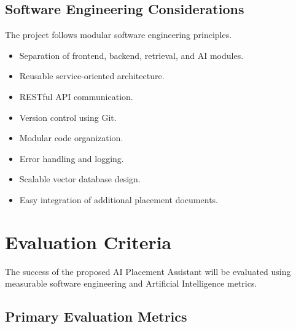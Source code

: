 \documentclass[11pt]{article}
\begin{document}
\subsection{Software Engineering Considerations}

The project follows modular software engineering principles.

\begin{itemize}

\item Separation of frontend, backend, retrieval, and AI modules.

\item Reusable service-oriented architecture.

\item RESTful API communication.

\item Version control using Git.

\item Modular code organization.

\item Error handling and logging.

\item Scalable vector database design.

\item Easy integration of additional placement documents.

\end{itemize}
\section{Evaluation Criteria}

The success of the proposed AI Placement Assistant will be evaluated using measurable software engineering and Artificial Intelligence metrics.

\subsection{Primary Evaluation Metrics}
\end{document}
